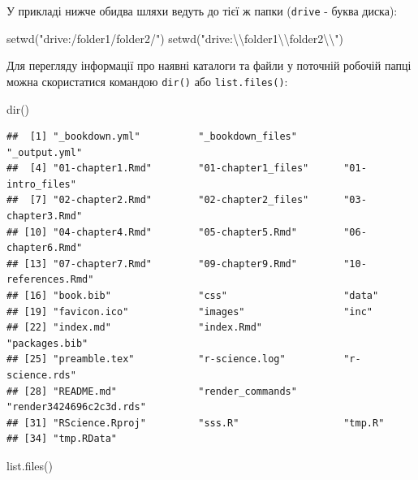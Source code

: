 \documentclass[
]{book}
\newenvironment{Shaded}{\begin{snugshade}}{\end{snugshade}}
\newcommand{\FunctionTok}[1]{\textcolor[rgb]{0.00,0.00,0.00}{#1}}
\newcommand{\NormalTok}[1]{#1}
\newcommand{\SpecialCharTok}[1]{\textcolor[rgb]{0.00,0.00,0.00}{#1}}
\newcommand{\StringTok}[1]{\textcolor[rgb]{0.31,0.60,0.02}{#1}}
\begin{document}
У прикладі нижче обидва шляхи ведуть до тієї ж папки (\texttt{drive} - буква диска):

\begin{Shaded}
\begin{Highlighting}[]
\FunctionTok{setwd}\NormalTok{(}\StringTok{"drive:/folder1/folder2/"}\NormalTok{)}
\FunctionTok{setwd}\NormalTok{(}\StringTok{"drive:}\SpecialCharTok{\textbackslash{}\textbackslash{}}\StringTok{folder1}\SpecialCharTok{\textbackslash{}\textbackslash{}}\StringTok{folder2}\SpecialCharTok{\textbackslash{}\textbackslash{}}\StringTok{"}\NormalTok{)}
\end{Highlighting}
\end{Shaded}

Для перегляду інформації про наявні каталоги та файли у поточній робочій папці можна скористатися командою \texttt{dir()} або \texttt{list.files()}:

\begin{Shaded}
\begin{Highlighting}[]
\FunctionTok{dir}\NormalTok{()}
\end{Highlighting}
\end{Shaded}

\begin{verbatim}
##  [1] "_bookdown.yml"          "_bookdown_files"        "_output.yml"           
##  [4] "01-chapter1.Rmd"        "01-chapter1_files"      "01-intro_files"        
##  [7] "02-chapter2.Rmd"        "02-chapter2_files"      "03-chapter3.Rmd"       
## [10] "04-chapter4.Rmd"        "05-chapter5.Rmd"        "06-chapter6.Rmd"       
## [13] "07-chapter7.Rmd"        "09-chapter9.Rmd"        "10-references.Rmd"     
## [16] "book.bib"               "css"                    "data"                  
## [19] "favicon.ico"            "images"                 "inc"                   
## [22] "index.md"               "index.Rmd"              "packages.bib"          
## [25] "preamble.tex"           "r-science.log"          "r-science.rds"         
## [28] "README.md"              "render_commands"        "render3424696c2c3d.rds"
## [31] "RScience.Rproj"         "sss.R"                  "tmp.R"                 
## [34] "tmp.RData"
\end{verbatim}

\begin{Shaded}
\begin{Highlighting}[]
\FunctionTok{list.files}\NormalTok{()}
\end{Highlighting}
\end{Shaded}
\end{document}
